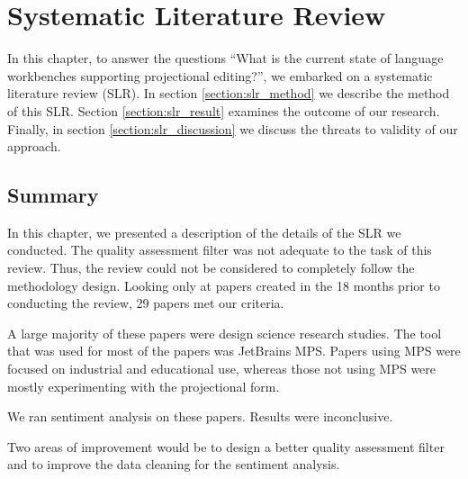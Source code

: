 \chapter{Systematic Literature Review}
\label{chapter:SLR}

In this chapter, to answer the questions ``What is the current state of language workbenches supporting projectional editing?'', we embarked on a systematic literature review (SLR).
In section \ref{section:slr_method} we describe the method of this SLR.
Section \ref{section:slr_result} examines the outcome of our research.
Finally, in section \ref{section:slr_discussion} we discuss the threats to validity of our approach. 








\section{Summary}
In this chapter, we presented a description of the details of the SLR we conducted.
The quality assessment filter was not adequate to the task of this review. 
Thus, the review could not be considered to completely follow the methodology design.
Looking only at papers created in the 18 months prior to conducting the review, 29 papers met our criteria.

A large majority of these papers were design science research studies.
The tool that was used for most of the papers was JetBrains MPS.
Papers using MPS were focused on industrial and educational use, whereas those not using MPS were mostly experimenting with the projectional form.

We ran sentiment analysis on these papers. 
Results were inconclusive.

Two areas of improvement would be to design a better quality assessment filter and to improve the data cleaning for the sentiment analysis.